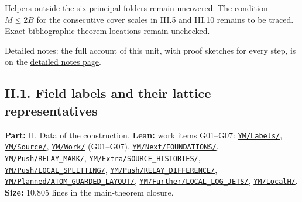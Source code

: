 \documentclass[
  letterpaper,
  11pt]{article}
\begin{document}
Helpers outside the six principal folders remain uncovered. The
condition \(M\le2B\) for the consecutive cover scales in III.5 and
III.10 remains to be traced. Exact bibliographic theorem locations
remain unchecked.

Detailed notes: the full account of this unit, with proof sketches for
every step, is on the
\href{https://github.com/scottnarmstrong/yang-mills-informalization/blob/main/outline/notes/I-1.md}{detailed
notes page}.

\subsection{II.1. Field labels and their lattice
representatives}\label{ii.1.-field-labels-and-their-lattice-representatives}

\textbf{Part:} II, Data of the construction. \textbf{Lean:} work items
G01--G07:
\href{https://github.com/yang-mills-group/OpenAI-YM-20261028/tree/3456e5e75cf8d4cd558955a5c7638fba2d68f464/YM/Labels}{\texttt{YM/Labels/}},
\href{https://github.com/yang-mills-group/OpenAI-YM-20261028/tree/3456e5e75cf8d4cd558955a5c7638fba2d68f464/YM/Source}{\texttt{YM/Source/}},
\href{https://github.com/yang-mills-group/OpenAI-YM-20261028/tree/3456e5e75cf8d4cd558955a5c7638fba2d68f464/YM/Work}{\texttt{YM/Work/}}
(G01--G07),
\href{https://github.com/yang-mills-group/OpenAI-YM-20261028/tree/3456e5e75cf8d4cd558955a5c7638fba2d68f464/YM/Next/FOUNDATIONS}{\texttt{YM/Next/FOUNDATIONS/}},
\href{https://github.com/yang-mills-group/OpenAI-YM-20261028/tree/3456e5e75cf8d4cd558955a5c7638fba2d68f464/YM/Push/RELAY_MARK}{\texttt{YM/Push/RELAY\_MARK/}},
\href{https://github.com/yang-mills-group/OpenAI-YM-20261028/tree/3456e5e75cf8d4cd558955a5c7638fba2d68f464/YM/Extra/SOURCE_HISTORIES}{\texttt{YM/Extra/SOURCE\_HISTORIES/}},
\href{https://github.com/yang-mills-group/OpenAI-YM-20261028/tree/3456e5e75cf8d4cd558955a5c7638fba2d68f464/YM/Push/LOCAL_SPLITTING}{\texttt{YM/Push/LOCAL\_SPLITTING/}},
\href{https://github.com/yang-mills-group/OpenAI-YM-20261028/tree/3456e5e75cf8d4cd558955a5c7638fba2d68f464/YM/Push/RELAY_DIFFERENCE}{\texttt{YM/Push/RELAY\_DIFFERENCE/}},
\href{https://github.com/yang-mills-group/OpenAI-YM-20261028/tree/3456e5e75cf8d4cd558955a5c7638fba2d68f464/YM/Planned/ATOM_GUARDED_LAYOUT}{\texttt{YM/Planned/ATOM\_GUARDED\_LAYOUT/}},
\href{https://github.com/yang-mills-group/OpenAI-YM-20261028/tree/3456e5e75cf8d4cd558955a5c7638fba2d68f464/YM/Further/LOCAL_LOG_JETS}{\texttt{YM/Further/LOCAL\_LOG\_JETS/}},
\href{https://github.com/yang-mills-group/OpenAI-YM-20261028/tree/3456e5e75cf8d4cd558955a5c7638fba2d68f464/YM/LocalH}{\texttt{YM/LocalH/}}.
\textbf{Size:} 10,805 lines in the main-theorem closure.
\end{document}
